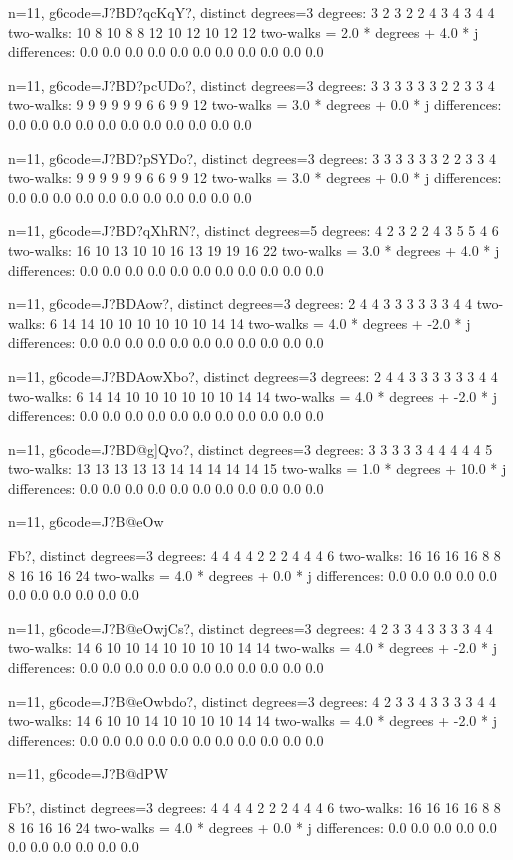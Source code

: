 {{{{{{{{{{{n=11, g6code=J?BD?qcKqY?, distinct degrees=3
degrees: 3 2 3 2 2 4 3 4 3 4 4 
two-walks: 10 8 10 8 8 12 10 12 10 12 12 
two-walks = 2.0 * degrees + 4.0 * j
differences: 0.0 0.0 0.0 0.0 0.0 0.0 0.0 0.0 0.0 0.0 0.0 

n=11, g6code=J?BD?pcUDo?, distinct degrees=3
degrees: 3 3 3 3 3 3 2 2 3 3 4 
two-walks: 9 9 9 9 9 9 6 6 9 9 12 
two-walks = 3.0 * degrees + 0.0 * j
differences: 0.0 0.0 0.0 0.0 0.0 0.0 0.0 0.0 0.0 0.0 0.0 

n=11, g6code=J?BD?pSYDo?, distinct degrees=3
degrees: 3 3 3 3 3 3 2 2 3 3 4 
two-walks: 9 9 9 9 9 9 6 6 9 9 12 
two-walks = 3.0 * degrees + 0.0 * j
differences: 0.0 0.0 0.0 0.0 0.0 0.0 0.0 0.0 0.0 0.0 0.0 

n=11, g6code=J?BD?qXhRN?, distinct degrees=5
degrees: 4 2 3 2 2 4 3 5 5 4 6 
two-walks: 16 10 13 10 10 16 13 19 19 16 22 
two-walks = 3.0 * degrees + 4.0 * j
differences: 0.0 0.0 0.0 0.0 0.0 0.0 0.0 0.0 0.0 0.0 0.0 

n=11, g6code=J?BDAow\BS?, distinct degrees=3
degrees: 2 4 4 3 3 3 3 3 3 4 4 
two-walks: 6 14 14 10 10 10 10 10 10 14 14 
two-walks = 4.0 * degrees + -2.0 * j
differences: 0.0 0.0 0.0 0.0 0.0 0.0 0.0 0.0 0.0 0.0 0.0 

n=11, g6code=J?BDAowXbo?, distinct degrees=3
degrees: 2 4 4 3 3 3 3 3 3 4 4 
two-walks: 6 14 14 10 10 10 10 10 10 14 14 
two-walks = 4.0 * degrees + -2.0 * j
differences: 0.0 0.0 0.0 0.0 0.0 0.0 0.0 0.0 0.0 0.0 0.0 

n=11, g6code=J?BD@g]Qvo?, distinct degrees=3
degrees: 3 3 3 3 3 4 4 4 4 4 5 
two-walks: 13 13 13 13 13 14 14 14 14 14 15 
two-walks = 1.0 * degrees + 10.0 * j
differences: 0.0 0.0 0.0 0.0 0.0 0.0 0.0 0.0 0.0 0.0 0.0 

n=11, g6code=J?B@eOw{Fb?, distinct degrees=3
degrees: 4 4 4 4 2 2 2 4 4 4 6 
two-walks: 16 16 16 16 8 8 8 16 16 16 24 
two-walks = 4.0 * degrees + 0.0 * j
differences: 0.0 0.0 0.0 0.0 0.0 0.0 0.0 0.0 0.0 0.0 0.0 

n=11, g6code=J?B@eOwjCs?, distinct degrees=3
degrees: 4 2 3 3 4 3 3 3 3 4 4 
two-walks: 14 6 10 10 14 10 10 10 10 14 14 
two-walks = 4.0 * degrees + -2.0 * j
differences: 0.0 0.0 0.0 0.0 0.0 0.0 0.0 0.0 0.0 0.0 0.0 

n=11, g6code=J?B@eOwbdo?, distinct degrees=3
degrees: 4 2 3 3 4 3 3 3 3 4 4 
two-walks: 14 6 10 10 14 10 10 10 10 14 14 
two-walks = 4.0 * degrees + -2.0 * j
differences: 0.0 0.0 0.0 0.0 0.0 0.0 0.0 0.0 0.0 0.0 0.0 

n=11, g6code=J?B@dPW{Fb?, distinct degrees=3
degrees: 4 4 4 4 2 2 2 4 4 4 6 
two-walks: 16 16 16 16 8 8 8 16 16 16 24 
two-walks = 4.0 * degrees + 0.0 * j
differences: 0.0 0.0 0.0 0.0 0.0 0.0 0.0 0.0 0.0 0.0 0.0 

}}}}}}}}}}}}}
